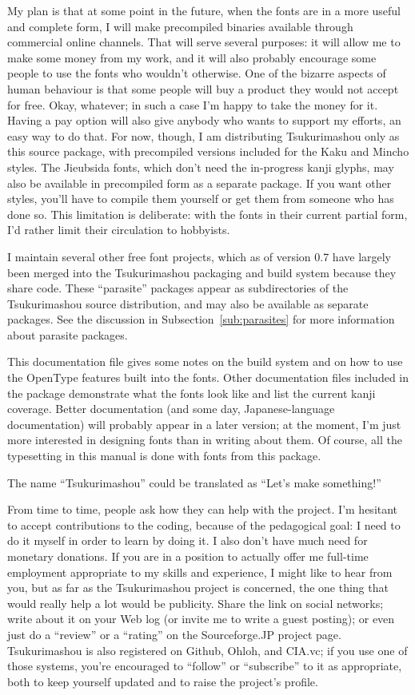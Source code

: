 \documentclass[14pt]{extarticle}
\begin{document}
My plan is that at some point in the future, when the fonts are in a more
useful and complete form, I will make precompiled binaries available through
commercial online channels.  That will serve several purposes: it will allow
me to make some money from my work, and it will also probably encourage some
people to use the fonts who wouldn't otherwise.  One of the bizarre aspects
of human behaviour is that some people will buy a product they would not
accept for free.  Okay, whatever; in such a case I'm happy to take the money
for it.  Having a pay option will also give anybody who wants to support my
efforts, an easy way to do that.  For now, though, I am distributing
Tsukurimashou only as this source package, with precompiled versions
included for the Kaku and Mincho styles.  The Jieubsida fonts, which don't
need the in-progress kanji glyphs, may also be available in precompiled form
as a separate package.  If you want other styles, you'll have to compile
them yourself or get them from someone who has done so.  This limitation is
deliberate: with the fonts in their current partial form, I'd rather limit
their circulation to hobbyists.

I maintain several other free font projects, which as of version 0.7 have
largely been merged into the Tsukurimashou packaging and build system
because they share code.  These ``parasite'' packages appear as
subdirectories of the Tsukurimashou source distribution, and may also be
available as separate packages.  See the discussion in
Subsection~\ref{sub:parasites} for more information about parasite packages.

This documentation file gives some notes on the build system and on how
to use the OpenType features built into the fonts.  Other documentation
files included in the package demonstrate what the fonts look like and
list the current kanji coverage.  Better documentation (and some day,
Japanese-language documentation) will probably appear in a later
version; at the moment, I'm just more interested in designing fonts
than in writing about them.  Of course, all the typesetting in this
manual is done with fonts from this package.

The name ``Tsukurimashou'' could be translated as ``Let's make something!''

From time to time, people ask how they can help with the project.  I'm
hesitant to accept contributions to the coding, because of the pedagogical
goal: I need to do it myself in order to learn by doing it.  I also don't
have much need for monetary donations.  If you are in a position to actually
offer me full-time employment appropriate to my skills and experience, I
might like to hear from you, but as far as the Tsukurimashou project is
concerned, the one thing that would really help a lot would be publicity. 
Share the link on social networks; write about it on your Web log (or invite
me to write a guest posting); or even just do a ``review'' or a ``rating''
on the Sourceforge.JP project page.  Tsukurimashou is also registered on
Github, Ohloh, and CIA.vc; if you use one of those systems, you're
encouraged to ``follow'' or ``subscribe'' to it as appropriate, both to keep
yourself updated and to raise the project's profile.
\end{document}
